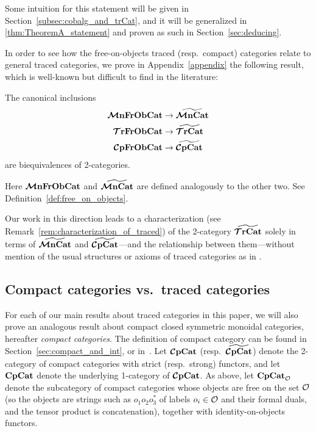 \documentclass[11pt,oneside,article]{memoir}
\begin{document}
{Some intuition for this statement will be given in Section~\ref{subsec:cobalg_and_trCat}, and it
will be generalized in \ref{thm:TheoremA_statement} and proven as such in Section~\ref{sec:deducing}.

In order to see how the
free-on-objects traced (resp.\ compact) categories relate to general traced categories, we prove in
Appendix~\ref{appendix} the following result, which is well-known but difficult to find in the
literature:

\begin{corollary*}[\ref{cor:object_frees}]
   The canonical inclusions
   \begin{align*}
      \bm{\mathcal{M}}\mathbf{nFrObCat} &\to \widetilde{\bm{\mathcal{M}}\mathbf{nCat}} \\
      \bm{\mathcal{T}}\mathbf{rFrObCat} &\to \widetilde{\bm{\mathcal{T}}\mathbf{rCat}} \\
      \bm{\mathcal{C}}\mathbf{pFrObCat} &\to \widetilde{\bm{\mathcal{C}}\mathbf{pCat}}
   \end{align*}
   are biequivalences of 2-categories.
\end{corollary*}

Here $\bm{\mathcal{M}}\mathbf{nFrObCat}$ and $\widetilde{\bm{\mathcal{M}}\mathbf{nCat}}$ are defined analogously to the other two. See
Definition~\ref{def:free_on_objects}.



Our work in this direction leads to a characterization (see
Remark~\ref{rem:characterization_of_traced}) of the 2-category $\widetilde{\bm{\mathcal{T}}\mathbf{rCat}}$ solely in terms of
$\widetilde{\bm{\mathcal{M}}\mathbf{nCat}}$ and $\widetilde{\bm{\mathcal{C}}\mathbf{pCat}}$---and the relationship between them---without mention of the
usual structures or axioms of traced categories as in \cite{JoyalStreetVerity}.

\subsection{Compact categories vs.\ traced categories}

For each of our main results about traced categories in this paper, we will also prove an analogous
result about compact closed symmetric monoidal categories, hereafter \emph{compact categories}. The
definition of compact category can be found in Section~\ref{sec:compact_and_int}, or
in~\cite{MacL--CTWM}. Let $\bm{\mathcal{C}}\mathbf{pCat}$ (resp.\ $\widetilde{\bm{\mathcal{C}}\mathbf{pCat}}$) denote the 2-category of compact
categories with strict (resp.\ strong) functors, and let $\mathbf{CpCat}$ denote the underlying 1-category
of $\bm{\mathcal{C}}\mathbf{pCat}$. As above, let $\mathbf{CpCat}_{\mathcal{O}}$ denote the subcategory of compact categories
whose objects are free on the set $\mathcal{O}$ (so the objects are strings such as $o_1o_2o_3^*$ of
labels $o_i\in\mathcal{O}$ and their formal duals, and the tensor product is concatenation), together
with identity-on-objects functors.

}
\end{document}
